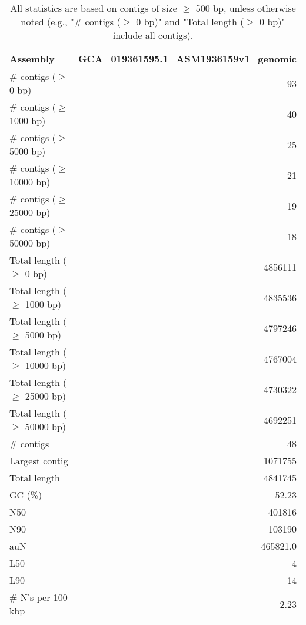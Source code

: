 \documentclass[12pt,a4paper]{article}
\begin{document}
\begin{table}[ht]
\begin{center}
\caption{All statistics are based on contigs of size $\geq$ 500 bp, unless otherwise noted (e.g., "\# contigs ($\geq$ 0 bp)" and "Total length ($\geq$ 0 bp)" include all contigs).}
\begin{tabular}{|l*{1}{|r}|}
\hline
Assembly & GCA\_019361595.1\_ASM1936159v1\_genomic \\ \hline
\# contigs ($\geq$ 0 bp) & 93 \\ \hline
\# contigs ($\geq$ 1000 bp) & 40 \\ \hline
\# contigs ($\geq$ 5000 bp) & 25 \\ \hline
\# contigs ($\geq$ 10000 bp) & 21 \\ \hline
\# contigs ($\geq$ 25000 bp) & 19 \\ \hline
\# contigs ($\geq$ 50000 bp) & 18 \\ \hline
Total length ($\geq$ 0 bp) & 4856111 \\ \hline
Total length ($\geq$ 1000 bp) & 4835536 \\ \hline
Total length ($\geq$ 5000 bp) & 4797246 \\ \hline
Total length ($\geq$ 10000 bp) & 4767004 \\ \hline
Total length ($\geq$ 25000 bp) & 4730322 \\ \hline
Total length ($\geq$ 50000 bp) & 4692251 \\ \hline
\# contigs & 48 \\ \hline
Largest contig & 1071755 \\ \hline
Total length & 4841745 \\ \hline
GC (\%) & 52.23 \\ \hline
N50 & 401816 \\ \hline
N90 & 103190 \\ \hline
auN & 465821.0 \\ \hline
L50 & 4 \\ \hline
L90 & 14 \\ \hline
\# N's per 100 kbp & 2.23 \\ \hline
\end{tabular}
\end{center}
\end{table}
\end{document}
